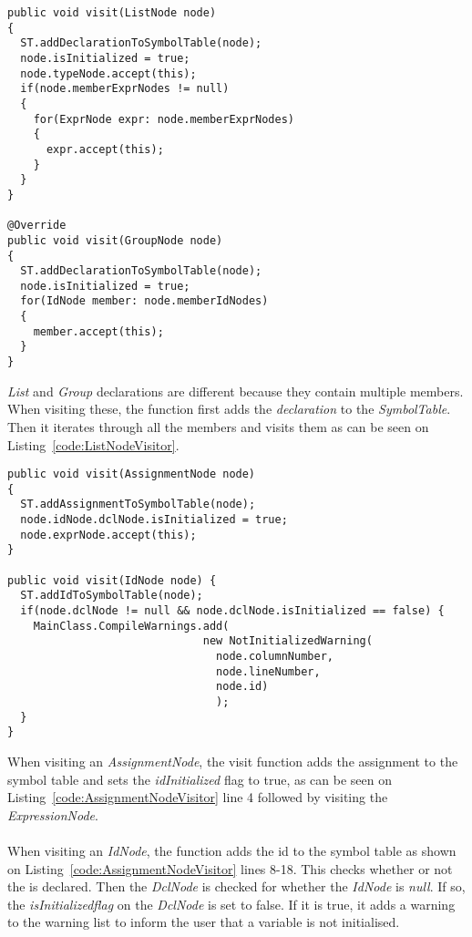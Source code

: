 \begin{lstlisting}[caption={Code for the ListNode visitor}, label={code:ListNodeVisitor}]
public void visit(ListNode node)
{
  ST.addDeclarationToSymbolTable(node);
  node.isInitialized = true;
  node.typeNode.accept(this);
  if(node.memberExprNodes != null)
  {
    for(ExprNode expr: node.memberExprNodes)
    {
      expr.accept(this);
    }
  }
}

@Override
public void visit(GroupNode node)
{
  ST.addDeclarationToSymbolTable(node);
  node.isInitialized = true;
  for(IdNode member: node.memberIdNodes) 
  {
    member.accept(this);
  }
}
\end{lstlisting}
\textit{List} and \textit{Group} declarations are different because they contain multiple members. When visiting these, the function first adds the \textit{declaration} to the \textit{SymbolTable}. Then it iterates through all the members and visits them as can be seen on Listing~\ref{code:ListNodeVisitor}.

\begin{lstlisting}[caption={Code for the AssignmentNode visitor}, label={code:AssignmentNodeVisitor}]
public void visit(AssignmentNode node)
{
  ST.addAssignmentToSymbolTable(node);
  node.idNode.dclNode.isInitialized = true;
  node.exprNode.accept(this);
}

public void visit(IdNode node) {
  ST.addIdToSymbolTable(node);
  if(node.dclNode != null && node.dclNode.isInitialized == false) {
    MainClass.CompileWarnings.add(
                              new NotInitializedWarning(
                                node.columnNumber, 
                                node.lineNumber, 
                                node.id)
                                );
  }
}
\end{lstlisting}
When visiting an \textit{AssignmentNode}, the visit function adds the assignment to the symbol table and sets the \textit{idInitialized} flag to true, as can be seen on Listing~\ref{code:AssignmentNodeVisitor} line 4 followed by visiting the \textit{ExpressionNode}.
\\\\
When visiting an \textit{IdNode}, the function adds the id to the symbol table as shown on Listing~\ref{code:AssignmentNodeVisitor} lines 8-18. 
This checks whether or not the is declared. 
Then the \textit{DclNode} is checked for whether the \textit{IdNode} is \textit{null}. 
If so, the \textit{isInitializedflag} on the \textit{DclNode} is set to false. 
If it is true, it adds a warning to the warning list to inform the user that a variable is not initialised.

